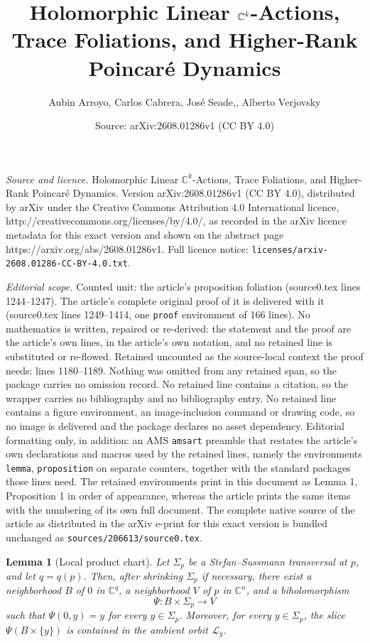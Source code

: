 \documentclass[10pt,a4paper]{amsart}
\title{Holomorphic Linear $\C^k$-Actions, Trace Foliations, and Higher-Rank Poincaré Dynamics}
\author{Aubin Arroyo, Carlos Cabrera, Jos\'e Seade,, Alberto Verjovsky}
\date{Source: arXiv:2608.01286v1 (CC BY 4.0)}
\newtheorem{lemma}{Lemma}
\newcommand{\C}{\mathbb{C}}
\newcommand{\leaf}[1]{\mathcal{L}_{#1}}
\begin{document}
\maketitle

\noindent\emph{Source and licence.} Holomorphic Linear $\C^k$-Actions, Trace Foliations, and Higher-Rank Poincaré Dynamics. Version arXiv:2608.01286v1 (CC BY 4.0), distributed by arXiv under the Creative Commons Attribution 4.0 International licence, http://creativecommons.org/licenses/by/4.0/, as recorded in the arXiv licence metadata for this exact version and shown on the abstract page https://arxiv.org/abs/2608.01286v1. Full licence notice: \texttt{licenses/arxiv-2608.01286-CC-BY-4.0.txt}.\par\smallskip

\noindent\textit{Editorial scope.} Counted unit: the article's proposition foliation (source0.tex lines 1244--1247). The article's complete original proof of it is delivered with it (source0.tex lines 1249--1414, one \texttt{proof} environment of 166 lines). No mathematics is written, repaired or re-derived: the statement and the proof are the article's own lines, in the article's own notation, and no retained line is substituted or re-flowed.  Retained uncounted as the source-local context the proof needs: lines 1180--1189.  Nothing was omitted from any retained span, so the package carries no omission record.  No retained line contains a citation, so the wrapper carries no bibliography and no bibliography entry.  No retained line contains a figure environment, an image-inclusion command or drawing code, so no image is delivered and the package declares no asset dependency.  Editorial formatting only, in addition: an AMS \texttt{amsart} preamble that restates the article's own declarations and macros used by the retained lines, namely the environments \texttt{lemma}, \texttt{proposition} on separate counters, together with the standard packages those lines need.  The retained environments print in this document as Lemma 1, Proposition 1 in order of appearance, whereas the article prints the same items with the numbering of its own full document.  The complete native source of the article as distributed in the arXiv e-print for this exact version is bundled unchanged as \texttt{sources/206613/source0.tex}.
\begin{lemma}[Local product chart]\label{lem:Local product chart} 
	Let $\Sigma_p$ be a Stefan--Sussmann transversal at $p$, and let $q=q(p)$.
	Then, after shrinking $\Sigma_p$ if necessary, there exist a neighborhood $B$ of $0$ in $\C^q$, a neighborhood $V$ of $p$ in $\C^n$, and a biholomorphism 
	\[
		\Psi:B\times\Sigma_p\longrightarrow V
	\]
	such that 
	$\Psi(0,y)=y$ for every $y\in\Sigma_p$.
	Moreover, for every $y\in\Sigma_p$, the slice $\Psi(B\times\{y\})$ is contained in the ambient orbit $\leaf{y}$.
\end{lemma}
\end{document}

